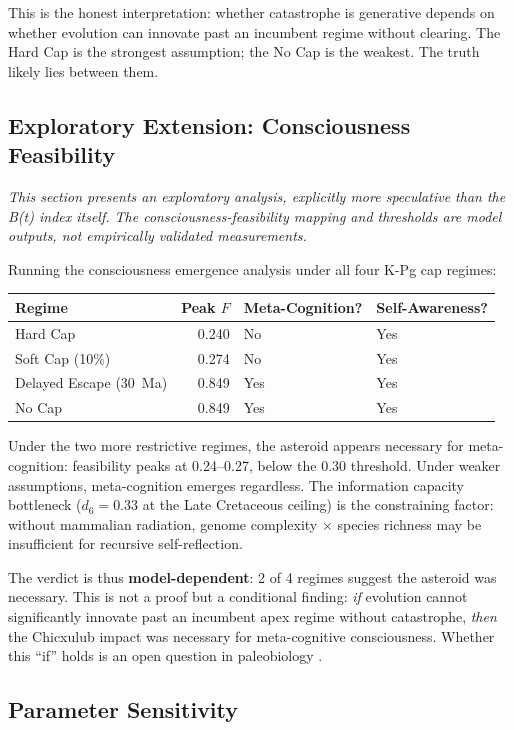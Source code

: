 \documentclass[10pt,letterpaper]{article}
\begin{document}
This is the honest interpretation: whether catastrophe is generative depends
on whether evolution can innovate past an incumbent regime without clearing.
The Hard Cap is the strongest assumption; the No Cap is the weakest. The truth
likely lies between them.

\subsection*{Exploratory Extension: Consciousness Feasibility}

\emph{This section presents an exploratory analysis, explicitly more speculative
than the B(t) index itself. The consciousness-feasibility mapping and thresholds
are model outputs, not empirically validated measurements.}

Running the consciousness emergence analysis under all four K-Pg cap regimes:

\begin{center}
\begin{tabular}{lrll}
\toprule
Regime & Peak $F$ & Meta-Cognition? & Self-Awareness? \\
\midrule
Hard Cap & 0.240 & No & Yes \\
Soft Cap (10\%) & 0.274 & No & Yes \\
Delayed Escape (30~Ma) & 0.849 & Yes & Yes \\
No Cap & 0.849 & Yes & Yes \\
\bottomrule
\end{tabular}
\end{center}

Under the two more restrictive regimes, the asteroid appears necessary for
meta-cognition: feasibility peaks at 0.24--0.27, below the 0.30 threshold.
Under weaker assumptions, meta-cognition emerges regardless. The information
capacity bottleneck ($d_6 = 0.33$ at the Late Cretaceous ceiling) is the
constraining factor: without mammalian radiation, genome complexity $\times$
species richness may be insufficient for recursive self-reflection.

The verdict is thus \textbf{model-dependent}: 2 of 4 regimes suggest the
asteroid was necessary. This is not a proof but a conditional finding:
\emph{if} evolution cannot significantly innovate past an incumbent apex
regime without catastrophe, \emph{then} the Chicxulub impact was necessary
for meta-cognitive consciousness. Whether this ``if'' holds is an open
question in paleobiology \cite{erwin2001}.

\subsection*{Parameter Sensitivity}
\end{document}

